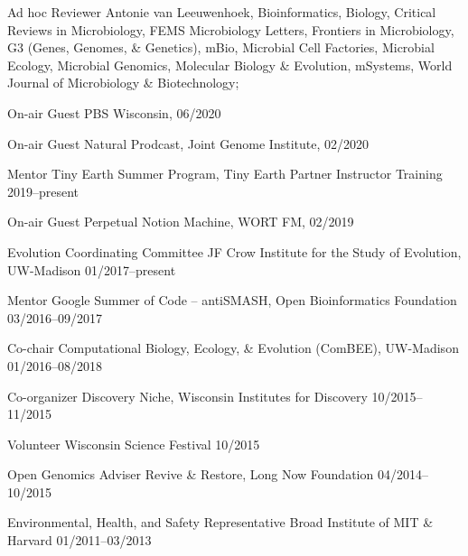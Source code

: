 

\begin{cvhonors}

\cvhonor
{Ad hoc Reviewer}
{Antonie van Leeuwenhoek, Bioinformatics, Biology, Critical Reviews in Microbiology, FEMS Microbiology Letters, Frontiers in Microbiology, G3 (Genes, Genomes, \& Genetics), mBio, Microbial Cell Factories, Microbial Ecology, Microbial Genomics, Molecular Biology \& Evolution, mSystems, World Journal of Microbiology \& Biotechnology; \textbf{\textit{}}}
{}

\cvhonor
{On-air Guest}
{PBS Wisconsin, \textbf{\textit{}}}
{06/2020}

\cvhonor
{On-air Guest}
{Natural Prodcast, Joint Genome Institute, \textbf{\textit{}}}
{02/2020}

\cvhonor
{Mentor}
{Tiny Earth Summer Program, Tiny Earth Partner Instructor Training}
{2019--present}

\cvhonor
{On-air Guest}
{Perpetual Notion Machine, WORT FM, \textbf{\textit{}}}
{02/2019}

\cvhonor
{Evolution Coordinating Committee}
{JF Crow Institute for the Study of Evolution, UW-Madison}
{01/2017--present}

\cvhonor
{Mentor}
{Google Summer of Code -- antiSMASH, Open Bioinformatics Foundation}
{03/2016--09/2017}

\cvhonor
{Co-chair}
{Computational Biology, Ecology, \& Evolution (ComBEE), UW-Madison}
{01/2016--08/2018}

\cvhonor
{Co-organizer}
{Discovery Niche, Wisconsin Institutes for Discovery}
{10/2015--11/2015}

\cvhonor
{Volunteer}
{Wisconsin Science Festival}
{10/2015}

\cvhonor
{Open Genomics Adviser}
{Revive \& Restore, Long Now Foundation}
{04/2014--10/2015}

\cvhonor
{Environmental, Health, and Safety Representative}
{Broad Institute of MIT \& Harvard}
{01/2011--03/2013}

\end{cvhonors}